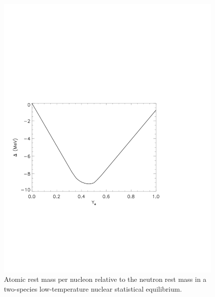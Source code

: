 \documentclass{article}    %
\begin{document}
\begin{figure}[htp]
\centering
\includegraphics[width=5in]{figures/fig1}
\caption{Atomic rest mass per nucleon relative to the neutron rest mass in a
two-species low-temperature nuclear statistical equilibrium.}
\label{fig:fig1}
\end{figure}
\end{document}
